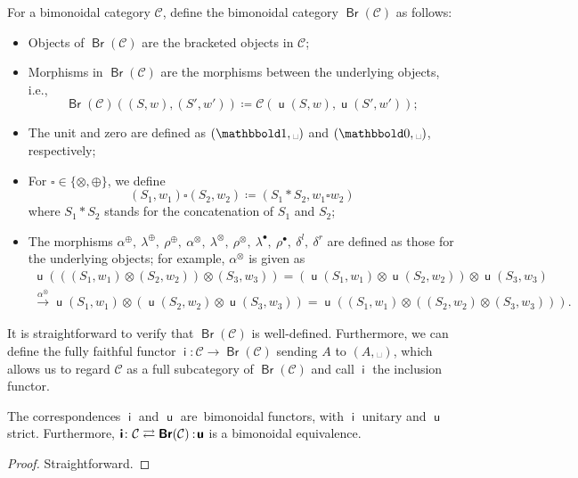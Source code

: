 \documentclass[10pt]{simplearticle}
\newcommand{\mathsb}[1]{\boldsymbol{\mathsf{#1}}}
\newcommand{\mmph}{\text{{␣}}}
\newcommand{\tensorunit}{\mathbbold1}
\newcommand{\bbzero}{\mathbbold0}
\newcommand{\Br}{\operatorname{\mathsb{Br}}}
\renewcommand{\i}{\operatorname{\mathsb i}}
\renewcommand{\u}{\operatorname{\mathsb u}}
\newcommand{\noloc}{\nobreak
\mspace{4mu plus 1mu}
{:}
\nonscript\mkern-\thinmuskip
\mathpunct{}
\mspace{2mu}
}
\begin{document}
\begin{defn}
For a bimonoidal category $\mathcal{C}$, define the bimonoidal category
$\Br(\mathcal{C})$ as follows:
\begin{itemize}
\item Objects of $\Br(\mathcal{C})$ are the bracketed objects in $\mathcal{C}$;
\item Morphisms in $\Br(\mathcal{C})$ are the morphisms between the underlying
objects, i.e.,
\[
\Br(\mathcal{C})((S,w),(S',w'))\coloneqq\mathcal{C}(\u(S,w),\u(S',w'));
\]
\item The unit and zero are defined as $(\tensorunit,\mmph)$ and $(\bbzero,\mmph)$,
respectively;
\item For $\square\in\{\otimes,\oplus\}$, we define
\[
(S_{1},w_{1})\square(S_{2},w_{2})\coloneqq(S_{1}*S_{2},w_{1}\square w_{2})
\]
where $S_{1}*S_{2}$ stands for the concatenation of $S_{1}$ and
$S_{2}$;
\item The morphisms $\alpha^{\oplus},~\lambda^{\oplus},~\rho^{\oplus},~\alpha^{\otimes},~\lambda^{\otimes},~\rho^{\otimes},~\lambda^{\bullet},~\rho^{\bullet},~\delta^{l},~\delta^{r}$
are defined as those for the underlying objects; for example, $\alpha^{\otimes}$
is given as
\begin{multline*}
\u\left(((S_{1},w_{1})\otimes(S_{2},w_{2}))\otimes(S_{3},w_{3})\right)=(\u(S_{1},w_{1})\otimes\u(S_{2},w_{2}))\otimes\u(S_{3},w_{3})\\
\xrightarrow{\alpha^{\otimes}}\u(S_{1},w_{1})\otimes(\u(S_{2},w_{2})\otimes\u(S_{3},w_{3}))=\u\left((S_{1},w_{1})\otimes((S_{2},w_{2})\otimes(S_{3},w_{3}))\right).
\end{multline*}
\end{itemize}
It is straightforward to verify that $\Br(\mathcal{C})$ is well-defined.
Furthermore, we can define the fully faithful functor $\i\colon\mathcal{C}\to\Br(\mathcal{C})$
sending $A$ to $(A,\mmph)$, which allows us to regard $\mathcal{C}$
as a full subcategory of $\Br(\mathcal{C})$ and call $\i$ the inclusion
functor.

\end{defn}

\begin{prop}\label{prop:reflector}
The
correspondences $\i$
and $\u$ are\ 
bimonoidal functors, with $\i$ unitary and $\u$
strict. Furthermore, $\i\colon\mathcal{C}\rightleftarrows\Br(\mathcal{C})\noloc\u$
is a bimonoidal equivalence.
\end{prop}

\begin{proof}
Straightforward.
\end{proof}
\end{document}
